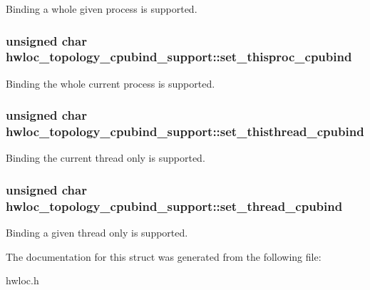 \label{a00023_aa166223d1c2a6de7256ab2d8b675a87e}
Binding a whole given process is supported. \hypertarget{a00023_a9403d51657a4d546b3ea9553a2973a27}{
\subsubsection[{set\_\-thisproc\_\-cpubind}]{\setlength{\rightskip}{0pt plus 5cm}unsigned char {\bf hwloc\_\-topology\_\-cpubind\_\-support::set\_\-thisproc\_\-cpubind}}}
\label{a00023_a9403d51657a4d546b3ea9553a2973a27}
Binding the whole current process is supported. \hypertarget{a00023_a57a89a4b5f1f74fa6cfe176f1e8b0798}{
\subsubsection[{set\_\-thisthread\_\-cpubind}]{\setlength{\rightskip}{0pt plus 5cm}unsigned char {\bf hwloc\_\-topology\_\-cpubind\_\-support::set\_\-thisthread\_\-cpubind}}}
\label{a00023_a57a89a4b5f1f74fa6cfe176f1e8b0798}
Binding the current thread only is supported. \hypertarget{a00023_a46fba33e307909ce256624687799dd6d}{
\subsubsection[{set\_\-thread\_\-cpubind}]{\setlength{\rightskip}{0pt plus 5cm}unsigned char {\bf hwloc\_\-topology\_\-cpubind\_\-support::set\_\-thread\_\-cpubind}}}
\label{a00023_a46fba33e307909ce256624687799dd6d}
Binding a given thread only is supported. 

The documentation for this struct was generated from the following file:\begin{DoxyCompactItemize}
\item 
hwloc.h\end{DoxyCompactItemize}
